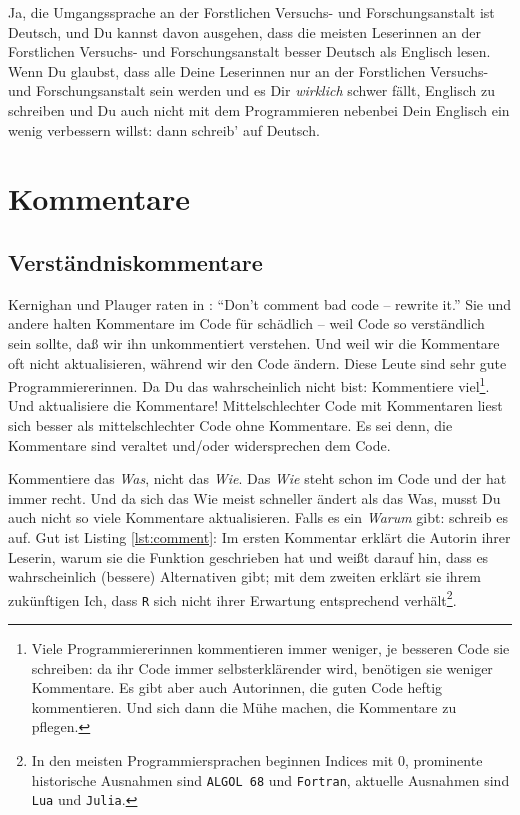 \documentclass[twoside]{scrreprt}
\providecommand{\R}{\texttt{R}}
\providecommand{\FVA}[1]{Forstliche#1 Versuchs- und Forschungs\-anstalt}
\begin{document}
 Ja, die Umgangssprache an der \FVA{n} ist Deutsch, und Du
kannst davon ausgehen, dass die meisten Leserinnen an der \FVA{n} besser Deutsch
als Englisch lesen. Wenn Du glaubst, dass alle Deine Leserinnen nur an der
\FVA{n} sein werden und es Dir \emph{wirklich} schwer f\"a{}llt, Englisch zu
schreiben und Du auch nicht mit dem Programmieren nebenbei Dein Englisch ein
wenig verbessern willst: dann schreib' auf Deutsch.

\section{Kommentare}
\subsection{Verst\"a{}ndniskommentare\label{sec:compcom}}
Kernighan und Plauger raten in \cite{KP}:
"`Don't comment bad code -- rewrite it."'
Sie und andere halten Kommentare im Code f\"u{}r sch\"a{}dlich  --
weil Code so verst\"a{}ndlich sein sollte, da\ss{} wir ihn unkommentiert
verstehen.
Und weil wir die Kommentare oft nicht aktualisieren, w\"a{}hrend wir den Code
\"a{}ndern.
Diese Leute sind sehr gute Programmiererinnen.
Da Du das wahrscheinlich nicht bist:
Kommentiere viel\footnote{Viele Programmiererinnen kommentieren immer weniger,
    je besseren Code sie schreiben: da ihr Code immer selbsterkl\"a{}render
    wird, ben\"o{}tigen sie weniger Kommentare. Es gibt aber auch Autorinnen,
    die guten Code heftig kommentieren. Und sich dann die M\"u{}he machen, die
    Kommentare zu pflegen.
}.
Und aktualisiere die Kommentare!
Mittelschlechter Code mit Kommentaren liest sich besser als mittelschlechter 
Code ohne Kommentare. Es sei denn, die Kommentare sind veraltet und/oder
widersprechen dem Code.

Kommentiere das \emph{Was}, nicht das \emph{Wie}. Das \emph{Wie} steht schon im
Code und der hat immer recht.
Und da sich das Wie meist schneller \"a{}ndert als das Was, musst Du auch
nicht so viele Kommentare aktualisieren.
Falls es ein \emph{Warum} gibt: schreib es auf.
Gut ist  Listing \ref{lst:comment}: Im ersten Kommentar erkl\"a{}rt die Autorin
ihrer Leserin, warum sie die Funktion geschrieben hat und wei\ss{}t darauf hin,
dass es wahrscheinlich (bessere) Alternativen gibt; mit dem zweiten
erkl\"a{}rt sie ihrem zuk\"u{}nftigen Ich, dass \R{} sich nicht ihrer Erwartung
entsprechend verh\"a{}lt\footnote{In den meisten Programmiersprachen beginnen
    Indices mit 0, prominente historische Ausnahmen sind \texttt{ALGOL 68} und
    \texttt{Fortran}, aktuelle Ausnahmen sind \texttt{Lua} und \texttt{Julia}.}.

\end{document}
